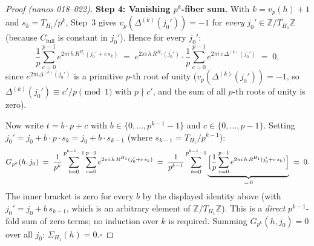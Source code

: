 \documentclass[
]{article}
\begin{document}
\begin{proof}[Proof (nanos 018--022)]
\textbf{Step 4: Vanishing $p^k$-fiber sum.}
With $k=v_p(h)+1$ and $s_k=T_{H_1}/p^k$, Step~3 gives
$v_p(\Delta^{(k)}(j_0'))=-1$ for \emph{every} $j_0'\in\mathbb{Z}/T_{H_1}\mathbb{Z}$
(because $C_{\mathrm{full}}$ is constant in $j_0'$).
Hence for every $j_0'$:
\[
  \frac{1}{p}\sum_{c=0}^{p-1}e^{2\pi i\,h\,R^{H_1}(j_0'+c\,s_k)}
  \;=\;e^{2\pi i\,h\,R^{H_1}(j_0')}\cdot
  \frac{1}{p}\sum_{c=0}^{p-1}e^{2\pi i\,c\,\Delta^{(k)}(j_0')}
  \;=\;0,
\]
since $e^{2\pi i\Delta^{(k)}(j_0')}$ is a primitive $p$-th root of unity
($v_p(\Delta^{(k)}(j_0'))=-1$, so $\Delta^{(k)}(j_0')\equiv c'/p\pmod{1}$
with $p\nmid c'$, and the sum of all $p$-th roots of unity is zero).

Now write $t=b\cdot p+c$ with $b\in\{0,\ldots,p^{k-1}-1\}$ and
$c\in\{0,\ldots,p-1\}$.  Setting $j_0'=j_0+b\cdot p\cdot s_k
=j_0+b\cdot s_{k-1}$ (where $s_{k-1}=T_{H_1}/p^{k-1}$):
\[
  G_{p^k}(h,j_0)
  \;=\;\frac{1}{p^k}\sum_{b=0}^{p^{k-1}-1}\sum_{c=0}^{p-1}
    e^{2\pi i\,h\,R^{H_1}(j_0'+c\,s_k)}
  \;=\;\frac{1}{p^{k-1}}\sum_{b=0}^{p^{k-1}-1}
    \underbrace{\Bigl[\frac{1}{p}\sum_{c=0}^{p-1}
      e^{2\pi i\,h\,R^{H_1}(j_0'+c\,s_k)}\Bigr]}_{=\,0}
  \;=\;0.
\]
The inner bracket is zero for every $b$ by the displayed identity above
(with $j_0'=j_0+b\,s_{k-1}$, which is an arbitrary element of
$\mathbb{Z}/T_{H_1}\mathbb{Z}$).
This is a \emph{direct} $p^{k-1}$-fold sum of zero terms; no induction
over $k$ is required.
Summing $G_{p^k}(h,j_0)=0$ over all $j_0$: $\Sigma_{H_1}(h)=0$.\hfill$\square$
\end{proof}
\end{document}
